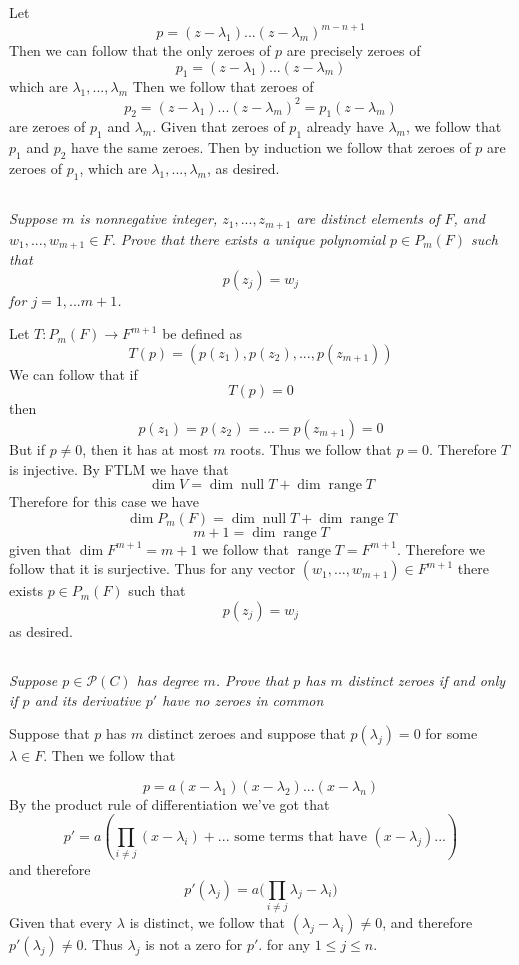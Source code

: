 \documentclass[11pt,oneside,titlepage]{book}
\DeclareMathOperator \ns {null}
\DeclareMathOperator \range {range}
\begin{document}
Let
$$p = (z - \lambda_1) ... (z - \lambda_m)^{m - n + 1}$$
Then we can follow that the only zeroes of $p$ are precisely zeroes of
$$p_1 = (z - \lambda_1) ... (z - \lambda_{m})$$
which are $\lambda_1, ..., \lambda_{m}$
Then  we follow that zeroes of
$$p_2 = (z - \lambda_1) ... (z - \lambda_{m})^2 = p_1(z - \lambda_m)$$
are zeroes of $p_1$ and $\lambda_m$. Given that zeroes of $p_1$ already have $\lambda_m$, we
follow that $p_1$ and $p_2$ have the same zeroes. Then by induction we follow that
zeroes of $p$ are zeroes of $p_1$, which are $\lambda_1, ..., \lambda_m$, as desired.

\subsection{}

\textit{Suppose $m$ is nonnegative integer, $z_1, ..., z_{m + 1}$ are distinct elements of $F$,
  and $w_1, ..., w_{m + 1} \in F$. Prove that there exists a unique polynomial $p \in P_m(F)$
  such that }
$$p(z_j) = w_j$$
\textit{for $j = 1, ... m + 1$.}

Let $T: P_m(F) \to F^{m + 1}$ be defined as
$$T(p) = (p(z_1), p(z_2), ..., p(z_{m + 1}))$$
We can follow that if
$$T(p) = 0$$
then
$$p(z_1) = p(z_2) = ... = p(z_{m + 1}) = 0$$
But if $p \neq 0$, then it has at most $m$ roots. Thus we follow that $p = 0$. Therefore $T$ is
injective. By FTLM we have that
$$\dim V = \dim \ns T + \dim \range T$$
Therefore for this case we have
$$\dim P_m(F) = \dim \ns T + \dim \range T$$
$$m + 1 =  \dim \range T$$
given that $\dim F^{m + 1} = m + 1$ we follow that $\range T = F^{m + 1}$. Therefore we
follow that it is surjective. Thus for any vector $(w_1, ..., w_{m + 1}) \in F^{m + 1}$
there exists $p \in P_m(F)$ such that
$$p(z_j) = w_j$$
as desired.

\subsection{}

\textit{Suppose $p \in \mathcal P(C)$ has degree $m$. Prove that $p$ has $m$ distinct zeroes if
  and only if $p$ and its derivative $p'$ have no zeroes in common}

Suppose that $p$ has $m$ distinct zeroes and suppose that $p(\lambda_j) = 0$ for
some $\lambda \in F$. Then we follow that

$$p = a(x - \lambda_1) (x - \lambda_2) ... (x - \lambda_n)$$
By the product rule of differentiation we've got that 
$$p' = a (\prod_{i \neq j}(x - \lambda_i) + ...\text{ some terms that have }(x - \lambda_j)...)$$
and therefore
$$p'(\lambda_j) = a (\prod_{i \neq j}{\lambda_j - \lambda_i)}$$
Given that every $\lambda$ is distinct, we follow that $(\lambda_j - \lambda_i) \neq 0$, and
therefore $p'(\lambda_j) \neq 0$. Thus $\lambda_j$ is not a zero for $p'$. for any
$1 \leq  j \leq n$.
\end{document}
